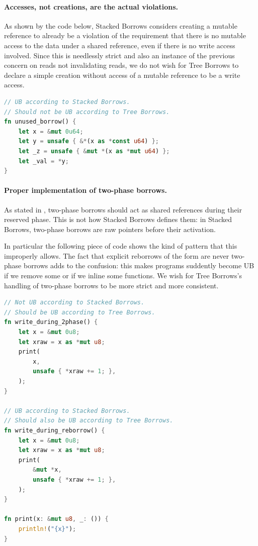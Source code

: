 \documentclass[a4paper,11pt]{article}
\theoremstyle{plain}
\theoremstyle{definition}
\theoremstyle{remark}
\newcommand{\tcode}[1]{\rstinline{#1}}
\begin{document}
\paragraph*{Accesses, not creations, are the actual violations.}
As shown by the code below, Stacked Borrows considers creating a mutable reference
to already be a violation of the requirement that there is no mutable access to
the data under a shared reference, even if there is no write access involved.
Since this is needlessly strict and also an instance of the previous concern on
reads not invalidating reads, we do not wish for Tree Borrows to declare a simple
creation without access of a mutable reference to be a write access.
\begin{lstlisting}[language=rust]
// UB according to Stacked Borrows.
// Should not be UB according to Tree Borrows.
fn unused_borrow() {
    let x = &mut 0u64;
    let y = unsafe { &*(x as *const u64) };
    let _z = unsafe { &mut *(x as *mut u64) };
    let _val = *y;
}
\end{lstlisting}

\paragraph*{Proper implementation of two-phase borrows.}
As stated in \cite{rustc_dev_guide}, two-phase borrows should act as shared references
during their reserved phase. This is not how Stacked Borrows defines them: in
Stacked Borrows, two-phase borrows are raw pointers before their activation.

In particular the following piece of code shows the kind of pattern that this
improperly allows. The fact that explicit reborrows of the form \tcode{\&mut *x}
are never two-phase borrows adds to the confusion: this makes programs suddently
become UB if we remove some \tcode{\&mut*} or if we inline some functions.
We wish for Tree Borrows's handling of two-phase borrows to be more strict and
more consistent.
\begin{lstlisting}[language=rust]
// Not UB according to Stacked Borrows.
// Should be UB according to Tree Borrows.
fn write_during_2phase() {
    let x = &mut 0u8;
    let xraw = x as *mut u8;
    print(
        x,
        unsafe { *xraw += 1; },
    );
}

// UB according to Stacked Borrows.
// Should also be UB according to Tree Borrows.
fn write_during_reborrow() {
    let x = &mut 0u8;
    let xraw = x as *mut u8;
    print(
        &mut *x,
        unsafe { *xraw += 1; },
    );
}

fn print(x: &mut u8, _: ()) {
    println!("{x}");
}
\end{lstlisting}
\end{document}
